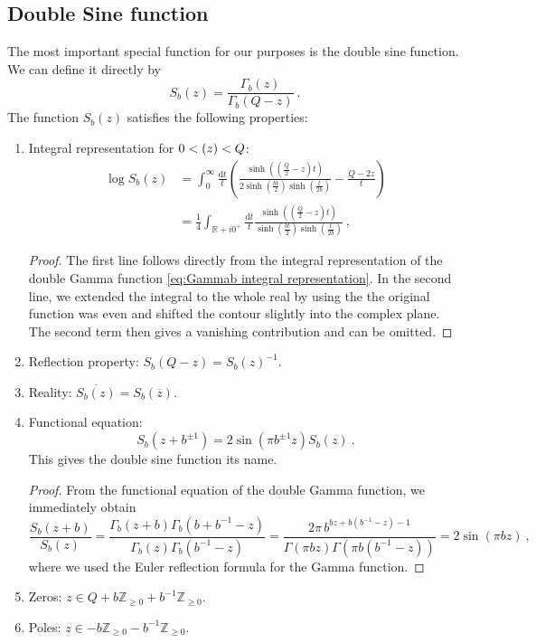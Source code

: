 \documentclass[12pt,a4paper]{article}
\newcommand{\be}{\begin{equation}}
\newcommand{\ee}{\end{equation}}
\newcommand\ZZ{\mathbb{Z}}
\newcommand\RR{\mathbb{R}}
\let\Re\relax
\DeclareMathOperator\Re{Re}
\begin{document}
\subsection{Double Sine function}
The most important special function for our purposes is the double sine function. We can define it directly by
\be  
S_b(z)=\frac{\Gamma_b(z)}{\Gamma_b(Q-z)}\ .
\ee 
The function $S_b(z)$ satisfies the following properties:
\begin{enumerate}
    \item Integral representation for $0<\Re(z)<Q$:
    \begin{align} 
    \log S_b(z)&=\int_0^\infty \frac{\mathrm{d}t}{t}\left(\frac{\sinh((\frac{Q}{2}-z)t)}{2 \sinh(\frac{b t}{2}) \sinh(\frac{t}{2b})}-\frac{Q-2z}{t}\right) \\
    &=\frac{1}{4}\int_{\RR+i 0^+} \frac{\mathrm{d}t}{t}\frac{\sinh((\frac{Q}{2}-z)t)}{ \sinh(\frac{b t}{2}) \sinh(\frac{t}{2b})}\ , \label{eq:S_b definition}
    \end{align}
    \begin{proof}
        The first line follows directly from the integral representation of the double Gamma function \eqref{eq:Gammab integral representation}.    
        In the second line, we extended the integral to the whole real by using the the original function was even and shifted the contour slightly into the complex plane. The second term then gives a vanishing contribution and can be omitted.
    \end{proof}
    \item Reflection property: $S_b(Q-z)=S_b(z)^{-1}$.
    \item Reality: $\overline{S_b(z)}=S_b(\overline{z})$.
    \item Functional equation:
    \be 
        S_b(z+b^{\pm 1})=2 \sin(\pi b^{\pm 1} z) S_b(z)\ . \label{eq:S_b functional equation}
    \ee
    This gives the double sine function its name.
    \begin{proof}
        From the functional equation of the double Gamma function, we immediately obtain
        \be  
            \frac{S_b(z+b)}{S_b(z)}=\frac{\Gamma_b(z+b)\Gamma_b(b+b^{-1}-z)}{\Gamma_b(z)\Gamma_b(b^{-1}-z)}=\frac{2\pi\, b^{bz+b(b^{-1}-z)-1}}{\Gamma(\pi b z)\Gamma(\pi b(b^{-1}-z))}=2\sin(\pi b z)\ ,
        \ee
        where we used the Euler reflection formula for the Gamma function.
    \end{proof}
    \item Zeros: $z \in Q+b \ZZ_{\ge 0}+b^{-1} \ZZ_{\ge 0}$.
    \item Poles: $z \in -b \ZZ_{\ge 0}-b^{-1} \ZZ_{\ge 0}$.

\end{enumerate}
\end{document}
